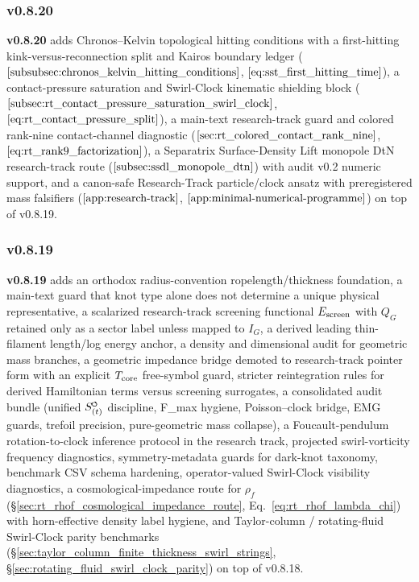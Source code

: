 \documentclass[11pt]{article}
\theoremstyle{definition}
\theoremstyle{plain}
\theoremstyle{remark}
\newcommand{\swirlarrow}{\mathchoice{\mkern-2mu\scriptstyle\boldsymbol{\circlearrowleft}}{\mkern-2mu\scriptstyle\boldsymbol{\circlearrowleft}}{\mkern-2mu\scriptscriptstyle\boldsymbol{\circlearrowleft}}{\mkern-2mu\scriptscriptstyle\boldsymbol{\circlearrowleft}}}
\newcommand{\SwirlClock}{{S_{(t)}^{\swirlarrow}}}
\begin{document}
        \subsubsection{v0.8.20}
            \textbf{v0.8.20} adds Chronos--Kelvin topological hitting conditions with a first-hitting kink-versus-reconnection split and Kairos boundary ledger (\(\ref{subsubsec:chronos_kelvin_hitting_conditions}\), \(\ref{eq:sst_first_hitting_time}\)), a contact-pressure saturation and Swirl-Clock kinematic shielding block (\(\ref{subsec:rt_contact_pressure_saturation_swirl_clock}\), \(\ref{eq:rt_contact_pressure_split}\)), a main-text research-track guard and colored rank-nine contact-channel diagnostic (\(\ref{sec:rt_colored_contact_rank_nine}\), \(\ref{eq:rt_rank9_factorization}\)), a Separatrix Surface-Density Lift monopole DtN research-track route (\(\ref{subsec:ssdl_monopole_dtn}\)) with audit v0.2 numeric support, and a canon-safe Research-Track particle/clock ansatz with preregistered mass falsifiers (\(\ref{app:research-track}\), \(\ref{app:minimal-numerical-programme}\)) on top of v0.8.19.

        \subsubsection{v0.8.19}
            \textbf{v0.8.19} adds an orthodox radius-convention ropelength/thickness foundation, a main-text guard that knot type alone does not determine a unique physical representative, a scalarized research-track screening functional \(E_{\rm screen}\) with \(Q_G\) retained only as a sector label unless mapped to \(I_G\), a derived leading thin-filament length/log energy anchor, a density and dimensional audit for geometric mass branches, a geometric impedance bridge demoted to research-track pointer form with an explicit \(T_{\rm core}\) free-symbol guard, stricter reintegration rules for derived Hamiltonian terms versus screening surrogates, a consolidated audit bundle (unified \(\SwirlClock\) discipline, F\_max hygiene, Poisson--clock bridge, EMG guards, trefoil precision, pure-geometric mass collapse), a Foucault-pendulum rotation-to-clock inference protocol in the research track, projected swirl-vorticity frequency diagnostics, symmetry-metadata guards for dark-knot taxonomy, benchmark CSV schema hardening, operator-valued Swirl-Clock visibility diagnostics, a cosmological-impedance route for \(\rho_f\) (\S\ref{sec:rt_rhof_cosmological_impedance_route}, Eq.~\ref{eq:rt_rhof_lambda_chi}) with horn-effective density label hygiene, and Taylor-column / rotating-fluid Swirl-Clock parity benchmarks (\S\ref{sec:taylor_column_finite_thickness_swirl_strings}, \S\ref{sec:rotating_fluid_swirl_clock_parity}) on top of v0.8.18.
\end{document}
